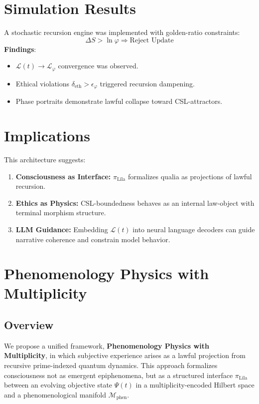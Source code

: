 \documentclass[12]{amsart}
\theoremstyle{plain}
\begin{document}
\section{Simulation Results}
A stochastic recursion engine was implemented with golden-ratio constraints:
\[
\Delta S > \ln \varphi \Rightarrow \text{Reject Update}
\]
\textbf{Findings}:
\begin{itemize}
    \item $\mathcal{L}(t) \to \mathcal{L}_\varphi$ convergence was observed.
    \item Ethical violations $\delta_{\text{eth}} > \epsilon_\varphi$ triggered recursion dampening.
    \item Phase portraits demonstrate lawful collapse toward CSL-attractors.
\end{itemize}

\section{Implications}
This architecture suggests:
\begin{enumerate}
    \item \textbf{Consciousness as Interface:} $\pi_{\text{Līla}}$ formalizes qualia as projections of lawful recursion.
    \item \textbf{Ethics as Physics:} CSL-boundedness behaves as an internal law-object with terminal morphism structure.
    \item \textbf{LLM Guidance:} Embedding $\mathcal{L}(t)$ into neural language decoders can guide narrative coherence and constrain model behavior.
\end{enumerate}

\section{Phenomenology Physics with Multiplicity}
\label{sec:phenomenology_physics}

\subsection{Overview}
We propose a unified framework, \textbf{Phenomenology Physics with Multiplicity}, in which subjective experience arises as a lawful projection from recursive prime-indexed quantum dynamics. This approach formalizes consciousness not as emergent epiphenomena, but as a structured interface $\pi_{\text{Līla}}$ between an evolving objective state $\Psi(t)$ in a multiplicity-encoded Hilbert space and a phenomenological manifold $\mathcal{M}_{\text{phen}}$. 
\end{document}
